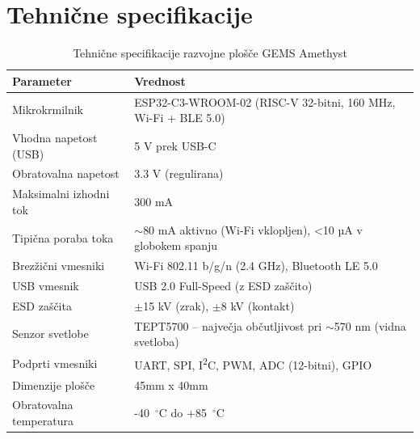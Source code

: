 \section{Tehnične specifikacije}
\begin{table}[H]
\centering
\caption{Tehnične specifikacije razvojne plošče GEMS Amethyst}
\begin{tabular}{|l|p{10cm}|}
\hline
\textbf{Parameter} & \textbf{Vrednost} \\
\hline
Mikrokrmilnik & ESP32-C3-WROOM-02 (RISC-V 32-bitni, 160 MHz, Wi-Fi + BLE 5.0) \\
\hline
Vhodna napetost (USB) & 5 V prek USB-C \\
\hline
Obratovalna napetost & 3.3 V (regulirana) \\
\hline
Maksimalni izhodni tok & 300 mA \\
\hline
Tipična poraba toka & $\sim$80 mA aktivno (Wi-Fi vklopljen), <10 µA v globokem spanju \\
\hline
Brezžični vmesniki & Wi-Fi 802.11 b/g/n (2.4 GHz), Bluetooth LE 5.0 \\
\hline
USB vmesnik & USB 2.0 Full-Speed (z ESD zaščito) \\
\hline
ESD zaščita & $\pm$15 kV (zrak), $\pm$8 kV (kontakt) \\
\hline
Senzor svetlobe & TEPT5700 – največja občutljivost pri $\sim$570 nm (vidna svetloba) \\
\hline
Podprti vmesniki & UART, SPI, I\textsuperscript{2}C, PWM, ADC (12-bitni), GPIO \\
\hline
Dimenzije plošče & 45mm x 40mm \\
\hline
Obratovalna temperatura & -40~$^\circ$C do +85~$^\circ$C \\
\hline
\end{tabular}
\label{tab:amethyst_spec_sl}
\end{table}



